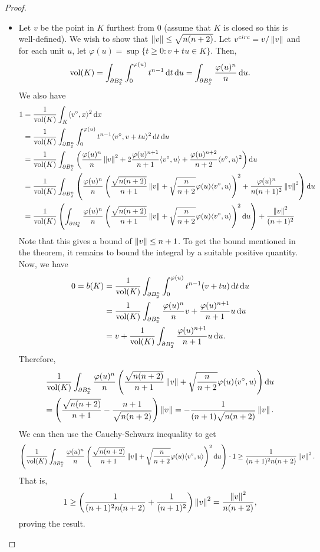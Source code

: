 \begin{proof}
\begin{itemize}
		\item Let $v$ be the point in $K$ furthest from $0$ (assume that $K$ is closed so this is well-defined). We wish to show that $\left\lVert v\right\rVert\leq\sqrt{n(n+2)}$. Let $v^{circ} = v/\left\lVert v\right\rVert$ and for each unit $u$, let $\varphi(u) = \sup\{t\geq 0 : v+tu\in K\}$. Then,
		\[ \operatorname{vol}(K) = \int_{\partial B_2^n} \int_{0}^{\varphi(u)} t^{n-1}\operatorname{d}\!{t}\operatorname{d}\!{u} = \int_{\partial B_2^n} \frac{\varphi(u)^n}{n} \operatorname{d}\!{u}. \]
		We also have
		\begin{align*}
			1 &= \frac{1}{\operatorname{vol}(K)} \int_K \langle v^\circ, x\rangle^2 \operatorname{d}\!{x} \\
			 &=  \frac{1}{\operatorname{vol}(K)} \int_{\partial B_2^n} \int_0^{\varphi(u)} t^{n-1} \langle v^\circ, v+tu\rangle^2 \operatorname{d}\!{t}\operatorname{d}\!{u} \\
			 &= \frac{1}{\operatorname{vol}(K)} \int_{\partial B_2^n} \left( \frac{\varphi(u)^n}{n}\left\lVert v\right\rVert^2 + 2\frac{\varphi(u)^{n+1}}{n+1} \langle v^\circ, u\rangle + \frac{\varphi(u)^{n+2}}{n+2} \langle v^\circ, u\rangle^2 \right) \operatorname{d}\!{u} \\
			 &= \frac{1}{\operatorname{vol}(K)} \int_{\partial B_2^n} \left( \frac{\varphi(u)^n}{n} \left(\frac{\sqrt{n(n+2)}}{n+1}\left\lVert v\right\rVert + \sqrt{\frac{n}{n+2}}\varphi(u) \langle v^\circ, u\rangle\right)^2 + \frac{\varphi(u)^n}{n(n+1)^2}\left\lVert v\right\rVert^2 \right) \operatorname{d}\!{u} \\
			 &= \frac{1}{\operatorname{vol}(K)} \left( \int_{\partial B_2^n} \frac{\varphi(u)^n}{n} \left(\frac{\sqrt{n(n+2)}}{n+1}\left\lVert v\right\rVert + \sqrt{\frac{n}{n+2}}\varphi(u)\langle v^\circ, u\rangle\right)^2 \operatorname{d}\!{u} \right) + \frac{\left\lVert v\right\rVert^2}{(n+1)^2}
		\end{align*}
		Note that this gives a bound of $\left\lVert v\right\rVert\leq n+1$. To get the bound mentioned in the theorem, it remains to bound the integral by a suitable positive quantity. Now, we have
		\begin{align*}
			0 = b(K) &= \frac{1}{\operatorname{vol}(K)} \int_{\partial B_2^n} \int_{0}^{\varphi(u)} t^{n-1} (v+tu) \operatorname{d}\!{t}\operatorname{d}\!{u} \\
			 &= \frac{1}{\operatorname{vol}(K)} \int_{\partial B_2^n} \frac{\varphi(u)^n}{n}v + \frac{\varphi(u)^{n+1}}{n+1}u \operatorname{d}\!{u} \\
			 &= v + \frac{1}{\operatorname{vol}(K)} \int_{\partial B_2^n} \frac{\varphi(u)^{n+1}}{n+1}u\operatorname{d}\!{u}.
		\end{align*}
		Therefore,
		\begin{multline*}
			\frac{1}{\operatorname{vol}(K)} \int_{\partial B_2^n} \frac{\varphi(u)^n}{n} \left(\frac{\sqrt{n(n+2)}}{n+1}\left\lVert v\right\rVert + \sqrt{\frac{n}{n+2}}\varphi(u) \langle v^\circ,u\rangle\right) \operatorname{d}\!{u} \\
			= \left(\frac{\sqrt{n(n+2)}}{n+1} - \frac{n+1}{\sqrt{n(n+2)}}\right)\left\lVert v\right\rVert = -\frac{1}{(n+1)\sqrt{n(n+2)}}\left\lVert v\right\rVert.
		\end{multline*}
		We can then use the Cauchy-Schwarz inequality to get
		\[ \left( \frac{1}{\operatorname{vol}(K)} \int_{\partial B_2^n} \frac{\varphi(u)^n}{n} \left(\frac{\sqrt{n(n+2)}}{n+1}\left\lVert v\right\rVert + \sqrt{\frac{n}{n+2}}\varphi(u)\langle v^\circ, u\rangle\right)^2 \operatorname{d}\!{u} \right) \cdot 1 \geq \frac{1}{(n+1)^2n(n+2)}\left\lVert v\right\rVert^2. \]
		That is,
		\[ 1 \geq \left(\frac{1}{(n+1)^2n(n+2)} + \frac{1}{(n+1)^2}\right)\left\lVert v\right\rVert^2 = \frac{\left\lVert v\right\rVert^2}{n(n+2)}, \]
		proving the result.
	\end{itemize}	
\end{proof}

